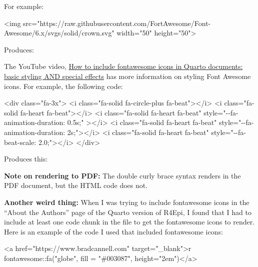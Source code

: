 \documentclass[
  letterpaper,
  DIV=11,
  numbers=noendperiod]{scrreprt}
\newenvironment{Shaded}{\begin{snugshade}}{\end{snugshade}}
\newcommand{\InformationTok}[1]{\textcolor[rgb]{0.37,0.37,0.37}{#1}}
\newcommand{\NormalTok}[1]{\textcolor[rgb]{0.00,0.23,0.31}{#1}}
\begin{document}
For example:

\begin{Shaded}
\begin{Highlighting}[]
\NormalTok{\textless{}img src="https://raw.githubusercontent.com/FortAwesome/Font{-}Awesome/6.x/svgs/solid/crown.svg" width="50" height="50"\textgreater{}}
\end{Highlighting}
\end{Shaded}

Produces:

The YouTube video,
\href{https://www.youtube.com/watch?v=u8EOVOjX13Y}{How to include
fontawesome icons in Quarto documents: basic styling AND special
effects} has more information on styling Font Awesome icons. For
example, the following code:

\begin{Shaded}
\begin{Highlighting}[]
\NormalTok{\textless{}div class="fa{-}3x"\textgreater{}}
\NormalTok{  \textless{}i class="fa{-}solid fa{-}circle{-}plus fa{-}beat"\textgreater{}\textless{}/i\textgreater{}}
\NormalTok{  \textless{}i class="fa{-}solid fa{-}heart fa{-}beat"\textgreater{}\textless{}/i\textgreater{}}
\NormalTok{  \textless{}i class="fa{-}solid fa{-}heart fa{-}beat" style="{-}{-}fa{-}animation{-}duration: 0.5s;" \textgreater{}\textless{}/i\textgreater{}}
\NormalTok{  \textless{}i class="fa{-}solid fa{-}heart fa{-}beat" style="{-}{-}fa{-}animation{-}duration: 2s;"\textgreater{}\textless{}/i\textgreater{}}
\NormalTok{  \textless{}i class="fa{-}solid fa{-}heart fa{-}beat" style="{-}{-}fa{-}beat{-}scale: 2.0;"\textgreater{}\textless{}/i\textgreater{}}
\NormalTok{\textless{}/div\textgreater{}}
\end{Highlighting}
\end{Shaded}

Produces this:

\textbf{Note on rendering to PDF:} The double curly brace syntax renders
in the PDF document, but the HTML code does not.

\textbf{Another weird thing:} When I was trying to include fontawesome
icons in the ``About the Authors'' page of the Quarto version of R4Epi,
I found that I had to include at least one code chunk in the file to get
the fontawesome icons to render. Here is an example of the code I used
that included fontawesome icons:

\begin{Shaded}
\begin{Highlighting}[]
\NormalTok{\textless{}a href="https://www.bradcannell.com" target="\_blank"\textgreater{}}\InformationTok{\textasciigrave{}r fontawesome::fa("globe", fill = "\#003087", height="2em")\textasciigrave{}}\NormalTok{\textless{}/a\textgreater{}}
\end{Highlighting}
\end{Shaded}
\end{document}
